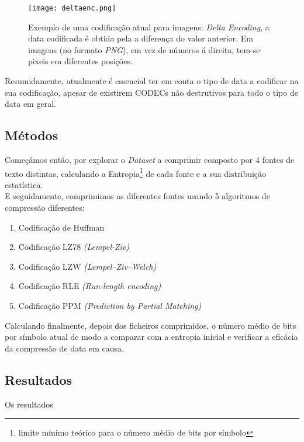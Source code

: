 \documentclass[12pt,journal,compsoc]{IEEEtran}
\begin{document}
\begin{figure}[h]

\texttt{[image: deltaenc.png]}

\caption{Exemplo de uma codificação atual para imagens: \textit{Delta Encoding}, a data codificada é obtida pela a diferença do valor anterior. Em imagens (no formato \textit{PNG}), em vez de números á direita, tem-se pixeis em diferentes posições.}
\end{figure}

Resumidamente, atualmente  é essencial ter em conta o tipo de data a codificar na sua codificação, apesar de existirem CODECs não destrutivos para todo o tipo de data em geral. 


\subsection{Métodos}\label{sec:metodos}
Começámos então, por explorar o \textit{Dataset} a comprimir composto por 4 fontes de texto distintas, calculando a Entropia\footnote{limite mínimo teórico para o número médio de bits por símbolo} de cada fonte e a sua distribuição estatística.\\
E seguidamente, comprimimos as diferentes fontes usando 5 algoritmos de compressão diferentes:

\begin{enumerate}
    \item Codificação de Huffman
    \item Codificação LZ78 \textit{(Lempel-Ziv)}
    \item Codificação LZW \textit{(Lempel–Ziv–Welch)}
    \item Codificação RLE \textit{(Run-length encoding)}
    \item Codificação PPM \textit{(Prediction by Partial Matching)}
\end{enumerate}

Calculando finalmente, depois dos ficheiros comprimidos, o número médio de bits por símbolo atual de modo a comparar com a entropia inicial e verificar a eficácia da compressão de data em causa.

\subsection{Resultados} %
Os resultados 


\end{document}
